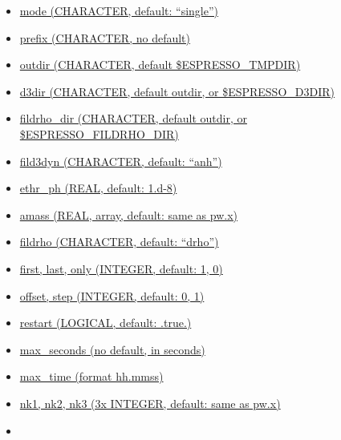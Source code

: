 \documentclass[
]{article}
\providecommand{\tightlist}{%
  \setlength{\itemsep}{0pt}\setlength{\parskip}{0pt}}
\begin{document}
\begin{itemize}
\begin{itemize}
\begin{itemize}
      \begin{itemize}
      \tightlist
      \item
        \protect\hyperlink{mode-character-default-single}{mode
        (CHARACTER, default: \enquote{single})}
      \item
        \protect\hyperlink{prefix-character-no-default}{prefix
        (CHARACTER, no default)}
      \item
        \protect\hyperlink{outdir-character-default-espresso_tmpdir}{outdir
        (CHARACTER, default \$ESPRESSO\_TMPDIR)}
      \item
        \protect\hyperlink{d3dir-character-default-outdir-or-espresso_d3dir}{d3dir
        (CHARACTER, default outdir, or \$ESPRESSO\_D3DIR)}
      \item
        \protect\hyperlink{fildrho_dir-character-default-outdir-or-espresso_fildrho_dir}{fildrho\_dir
        (CHARACTER, default outdir, or \$ESPRESSO\_FILDRHO\_DIR)}
      \item
        \protect\hyperlink{fild3dyn-character-default-anh}{fild3dyn
        (CHARACTER, default: \enquote{anh})}
      \item
        \protect\hyperlink{ethr_ph-real-default-1d-8}{ethr\_ph (REAL,
        default: 1.d-8)}
      \item
        \protect\hyperlink{amass-real-array-default-same-as-pwx}{amass
        (REAL, array, default: same as pw.x)}
      \item
        \protect\hyperlink{fildrho-character-default-drho}{fildrho
        (CHARACTER, default: \enquote{drho})}
      \item
        \protect\hyperlink{first-last-only-integer-default-1-0}{first,
        last, only (INTEGER, default: 1, 0)}
      \item
        \protect\hyperlink{offset-step-integer-default-0-1}{offset, step
        (INTEGER, default: 0, 1)}
      \item
        \protect\hyperlink{restart-logical-default-true}{restart
        (LOGICAL, default: .true.)}
      \item
        \protect\hyperlink{max_seconds-no-default-in-seconds}{max\_seconds
        (no default, in seconds)}
      \item
        \protect\hyperlink{max_time-format-hhmmss}{max\_time (format
        hh.mmss)}
      \item
        \protect\hyperlink{nk1-nk2-nk3-3x-integer-default-same-as-pwx}{nk1,
        nk2, nk3 (3x INTEGER, default: same as pw.x)}
      \item

\end{itemize}
\end{itemize}
\end{itemize}
\end{itemize}
\end{document}
